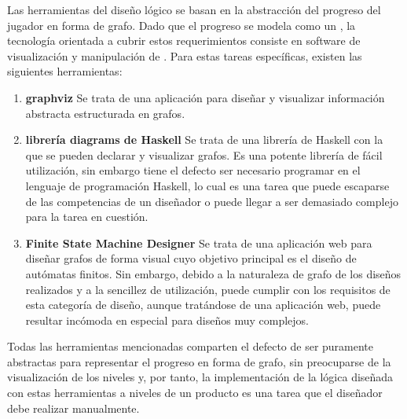 Las herramientas del diseño lógico se basan en la abstracción del progreso del jugador en forma de grafo.
Dado que el progreso se modela como un , la tecnología orientada a cubrir estos requerimientos consiste en software de visualización y manipulación de . Para estas tareas específicas, existen las siguientes herramientas:
\begin{enumerate}
	\item \textbf{graphviz\cite{graphviz}} Se trata de una aplicación para diseñar y visualizar información abstracta estructurada en grafos.
	\item \textbf{librería diagrams de Haskell\cite{haskell-diagrams}} Se trata de una librería de Haskell con la que se pueden declarar y visualizar grafos. Es una potente librería de fácil utilización, sin embargo tiene el defecto ser necesario programar en el lenguaje de programación Haskell, lo cual es una tarea que puede escaparse de las competencias de un diseñador o puede llegar a ser demasiado complejo para la tarea en cuestión.
	\item \textbf{Finite State Machine Designer\cite{finite-state-machine-designer}} Se trata de una aplicación web para diseñar grafos de forma visual cuyo objetivo principal es el diseño de autómatas finitos. Sin embargo, debido a la naturaleza de grafo de los diseños realizados y a la sencillez de utilización, puede cumplir con los requisitos de esta categoría de diseño, aunque tratándose de una aplicación web, puede resultar incómoda en especial para diseños muy complejos.
\end{enumerate}
Todas las herramientas mencionadas comparten el defecto de ser puramente abstractas para representar el progreso en forma de grafo, sin preocuparse de la visualización de los niveles y, por tanto, la implementación de la lógica diseñada con estas herramientas a niveles de un producto es una tarea que el diseñador debe realizar manualmente.